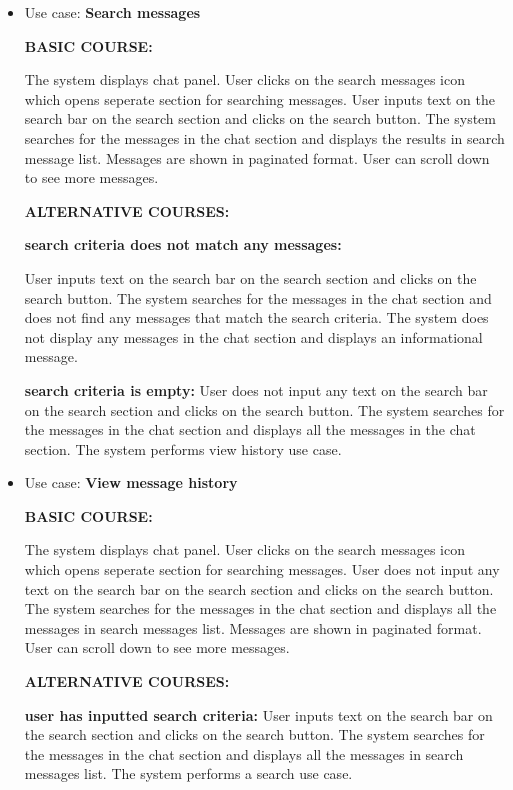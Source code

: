 \documentclass[]{VUMIFTemplateClass}
\begin{document}
\begin{itemize}
    \textbf{message already unpinned:}
    User tries to unpin a message that is already unpinned. The system does not send the message to the server and displays an error message.

    \item 
    Use case: \textbf{Search messages}

    \textbf{BASIC COURSE:}

    The system displays chat panel. User clicks on the search messages icon which opens seperate section for searching messages. User inputs text on the search bar on the search section and clicks on the search button. The system searches for the messages in the chat section and displays the results in search message list. Messages are shown in paginated format. User can scroll down to see more messages. 

    \textbf{ALTERNATIVE COURSES:}

    \textbf{search criteria does not match any messages:}

    User inputs text on the search bar on the search section and clicks on the search button. The system searches for the messages in the chat section and does not find any messages that match the search criteria. The system does not display any messages in the chat section and displays an informational message.

    \textbf{search criteria is empty:}
    User does not input any text on the search bar on the search section and clicks on the search button. The system searches for the messages in the chat section and displays all the messages in the chat section. The system performs view history use case.

    \item 
    Use case: \textbf{View message history}

    \textbf{BASIC COURSE:}

    The system displays chat panel. User clicks on the search messages icon which opens seperate section for searching messages. User does not input any text on the search bar on the search section and clicks on the search button. The system searches for the messages in the chat section and displays all the messages in search messages list. Messages are shown in paginated format. User can scroll down to see more messages. 

    \textbf{ALTERNATIVE COURSES:}

    \textbf{user has inputted search criteria:}
    User inputs text on the search bar on the search section and clicks on the search button. The system searches for the messages in the chat section and displays all the messages in search messages list. The system performs a search use case.


\end{itemize}
\end{document}

